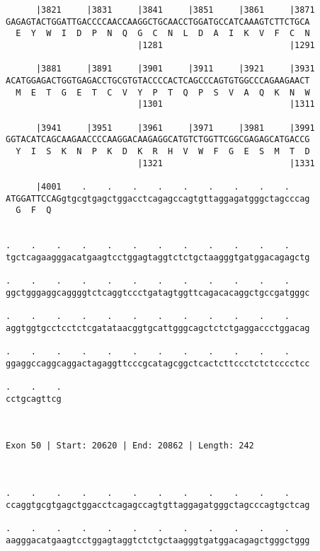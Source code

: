\documentclass{article}
\begin{document}
\begin{Verbatim}
      |3821     |3831     |3841     |3851     |3861     |3871
GAGAGTACTGGATTGACCCCAACCAAGGCTGCAACCTGGATGCCATCAAAGTCTTCTGCA
  E  Y  W  I  D  P  N  Q  G  C  N  L  D  A  I  K  V  F  C  N
                          |1281                         |1291
  
      |3881     |3891     |3901     |3911     |3921     |3931
ACATGGAGACTGGTGAGACCTGCGTGTACCCCACTCAGCCCAGTGTGGCCCAGAAGAACT
  M  E  T  G  E  T  C  V  Y  P  T  Q  P  S  V  A  Q  K  N  W
                          |1301                         |1311
  
      |3941     |3951     |3961     |3971     |3981     |3991
GGTACATCAGCAAGAACCCCAAGGACAAGAGGCATGTCTGGTTCGGCGAGAGCATGACCG
  Y  I  S  K  N  P  K  D  K  R  H  V  W  F  G  E  S  M  T  D
                          |1321                         |1331
  
      |4001    .    .    .    .    .    .    .    .    .    
ATGGATTCCAGgtgcgtgagctggacctcagagccagtgttaggagatgggctagcccag
  G  F  Q                                                   
                                                            
  
.    .    .    .    .    .    .    .    .    .    .    .    
tgctcagaagggacatgaagtcctggagtaggtctctgctaagggtgatggacagagctg
                                                            
.    .    .    .    .    .    .    .    .    .    .    .    
ggctgggaggcaggggtctcaggtccctgatagtggttcagacacaggctgccgatgggc
                                                            
.    .    .    .    .    .    .    .    .    .    .    .    
aggtggtgcctcctctcgatataacggtgcattgggcagctctctgaggaccctggacag
                                                            
.    .    .    .    .    .    .    .    .    .    .    .    
ggaggccaggcaggactagaggttcccgcatagcggctcactcttccctctctcccctcc
                                                            
.    .    .
cctgcagttcg
           
           
 
Exon 50 | Start: 20620 | End: 20862 | Length: 242



.    .    .    .    .    .    .    .    .    .    .    .    
ccaggtgcgtgagctggacctcagagccagtgttaggagatgggctagcccagtgctcag
                                                            
.    .    .    .    .    .    .    .    .    .    .    .    
aagggacatgaagtcctggagtaggtctctgctaagggtgatggacagagctgggctggg
                                                            

\end{Verbatim}
\end{document}
